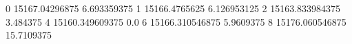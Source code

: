 0 15167.04296875 6.693359375
1 15166.4765625 6.126953125
2 15163.833984375 3.484375
4 15160.349609375 0.0
6 15166.310546875 5.9609375
8 15176.060546875 15.7109375
